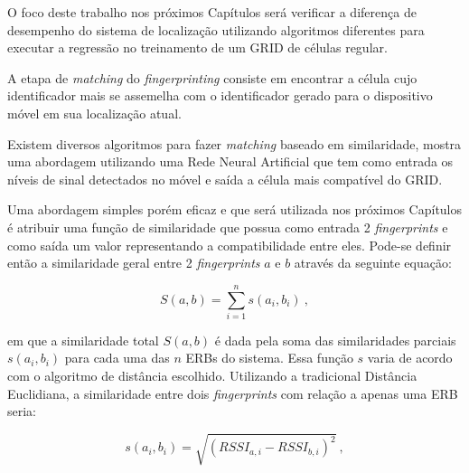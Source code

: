 \documentclass[12pt]{article}
\newcounter{subsubsubsection}[subsubsection]
\begin{document}
				O foco deste trabalho nos próximos Capítulos será verificar a diferença de desempenho do sistema de localização utilizando algoritmos diferentes para executar a regressão no treinamento de um GRID de células regular.
				
                \label{sec:algoritmoMatching}

                A etapa de \textit{matching} do \textit{fingerprinting} consiste em encontrar a célula cujo identificador mais se assemelha com o identificador gerado para o dispositivo móvel em sua localização atual.
                
                Existem diversos algoritmos para fazer \textit{matching} baseado em similaridade, \cite{handbookPositionLocation2012} mostra uma abordagem utilizando uma Rede Neural Artificial que tem como entrada os níveis de sinal detectados no móvel e saída a célula mais compatível do GRID.
                
                Uma abordagem simples porém eficaz e que será utilizada nos próximos Capítulos é atribuir uma função de similaridade que possua como entrada 2 \textit{fingerprints} e como saída um valor representando a compatibilidade entre eles. Pode-se definir então a similaridade geral entre 2 \textit{fingerprints} $a$ e $b$ através da seguinte equação:
                
                \begin{equation} 
                \label{eq:similaridadeGeral}
                S(a,b) = \sum_{i=1}^{n} s(a_{i}, b_{i})~,
                \end{equation}
                
                \noindent em que a similaridade total $S(a, b)$ é dada pela soma das similaridades parciais $s(a_{i}, b_{i})$ para cada uma das $n$ ERBs do sistema. Essa função $s$ varia de acordo com o algoritmo de distância escolhido. Utilizando a tradicional Distância Euclidiana, a similaridade entre dois \textit{fingerprints} com relação a apenas uma ERB seria: 
                
                \begin{equation}
                \label{eq:similaridadeEuclidianaParcial}
                s(a_{i}, b_{i}) = \sqrt{(RSSI_{a,i} - RSSI_{b,i})^2}~,
                \end{equation}
                
\end{document}
